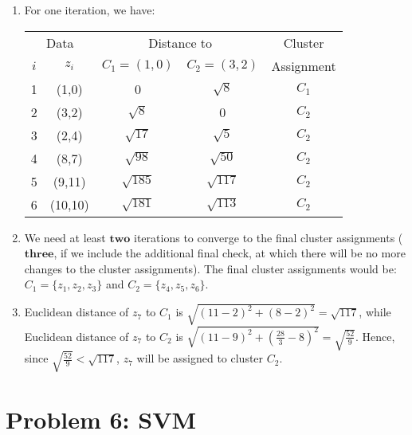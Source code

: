 \documentclass[11pt,fancychapters]{article}
\begin{document}
\begin{enumerate}[label=\textbf{\alph*)}]
	\item For one iteration, we have:
	
	\begin{table}[h!]
		\centering
		\begin{tabular}{|c | c | c | c | c|} 
			\hline
			\multicolumn{2}{|c|}{Data} & \multicolumn{2}{|c|}{Distance to} & Cluster\\
			\cline{1-4}
			$i$ & $z_i$ & $C_1=(1,0)$ & $C_2=(3,2)$ & Assignment\\
			\hline
			1 & (1,0) & 0 & $\sqrt{8}$ & $C_1$ \\ 
			\hline
			2 & (3,2) & $\sqrt{8}$ & 0 & $C_2$ \\
			\hline
			3 & (2,4) & $\sqrt{17}$ & $\sqrt{5}$ & $C_2$ \\
			\hline
			4 & (8,7) & $\sqrt{98}$ & $\sqrt{50}$ & $C_2$ \\
			\hline
			5 & (9,11) & $\sqrt{185}$ & $\sqrt{117}$ & $C_2$ \\
			\hline
			6 & (10,10) & $\sqrt{181}$ & $\sqrt{113}$ & $C_2$ \\ [1ex] 
			\hline
		\end{tabular}
	\end{table}

	\item We need at least $\textbf{two}$ iterations to converge to the final cluster assignments ($\textbf{three}$, if we include the additional final check, at which there will be no more changes to the cluster assignments). The final cluster assignments would be: $C_1 = \{z_1, z_2, z_3\}$ and $C_2 = \{z_4, z_5, z_6\}$.
	
	\item Euclidean distance of $z_7$ to $C_1$ is $\sqrt{(11-2)^2 + (8-2)^2} = \sqrt{117}$, while Euclidean distance of $z_7$ to $C_2$ is $\sqrt{(11-9)^2 + (\frac{28}{3}-8)^2} = \sqrt{\frac{52}{9}}$. Hence, since $\sqrt{\frac{52}{9}} < \sqrt{117}$, $z_7$ will be assigned to cluster $C_2$.
\end{enumerate}

\section*{Problem 6: SVM}
\end{document}
